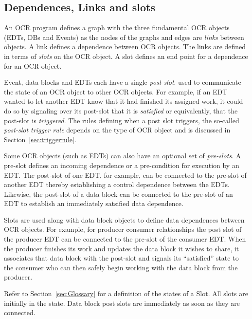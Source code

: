 \subsection{Dependences, Links and slots}
\label{sec:OCRlinks}


An OCR program defines a graph with the three fundamental OCR objects
(EDTs, DBs and Events) as the nodes of the graphs and edges are
\emph{links} between objects. A link defines a dependence
between OCR objects. The links are defined in terms of
\emph{slots} on the OCR object. A slot defines an end
point for a dependence for an OCR object.

Event, data blocks and EDTs each have a single \emph{post
slot}.  used to communicate the state of an OCR
object to other OCR objects. For example, if an EDT wanted to let
another EDT know that it had finished its assigned work, it could do
so by signaling over its post-slot that it is \emph{satisfied} or
equivalently, that the post-slot is \emph{triggered}. The rules
defining when a post slot triggers, the so-called \emph{post-slot
trigger rule} depends on the type of OCR
object and is discussed in Section~\ref{sec:triggerrule}.

Some OCR objects (such as EDTs) can also have an optional set of
\emph{pre-slots}. A pre-slot defines an incoming
dependence or a pre-condition for execution by an EDT. The post-slot
of one EDT, for example, can be connected to the pre-slot of another
EDT thereby establishing a control dependence between the EDTs. Likewise,
the post-slot of a data block can be connected to the pre-slot of an EDT
to establish an immediately satsified data dependence.

Slots are used along with data block objects to define data
dependences between OCR objects. For example,
for producer consumer relationships the post slot of the producer EDT can be connected to
the pre-slot of the consumer EDT. When the producer finishes its work
and updates the data block it wishes to share, it associates that data
block with the post-slot and signals its ``satisfied'' state to the
consumer who can then safely begin working with the data block from
the producer.

Refer to Section~\ref{sec:Glossary} for a definition of the states of
a Slot. All slots are initially in the  state. Data
block post slots are immediately  as soon as they are
connected.


